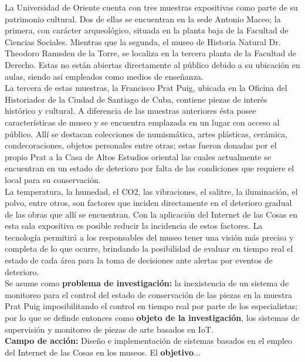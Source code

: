     La Universidad de Oriente cuenta con tres muestras expositivas como parte de su patrimonio cultural. Dos de ellas se encuentran en la sede Antonio Maceo; la primera, con carácter arqueológico, situada en la planta baja de la Facultad de Ciencias Sociales. Mientras que la segunda, el museo de Historia Natural Dr. Theodoro Ramsden de la Torre, se localiza en la tercera planta de la Facultad de Derecho. Estas no están abiertas directamente al público debido a su ubicación en aulas, siendo así empleados como medios de enseñanza.\\ 
    
    La tercera de estas muestras, la Francisco Prat Puig, ubicada en la Oficina del Historiador de la Ciudad de Santiago de Cuba, contiene piezas de interés histórico y cultural. A diferencia de las muestras anteriores ésta posee características de museo y se encuentra emplazada en un lugar con acceso al público. Allí se destacan colecciones de numismática, artes plásticas, cerámica, condecoraciones, objetos personales entre otras; estas fueron donadas por el propio Prat a la Casa de Altos Estudios oriental las cuales actualmente se encuentran en un estado de deterioro por falta de las condiciones que requiere el local para su conservación.\\
    
    La temperatura, la humedad, el CO2, las vibraciones, el salitre, la iluminación, el polvo, entre otros, son factores que inciden directamente en el deterioro gradual de las obras que allí se encuentran. Con la aplicación del Internet de las Cosas en esta sala expositiva es posible reducir la incidencia de estos factores. La tecnología permitirá a los responsables del museo tener una visión más precisa y completa de lo que ocurre, brindando la posibilidad de evaluar en tiempo real el estado de cada área para la toma de decisiones ante alertas por eventos de deterioro.\\

    Se asume como \textbf{problema de investigación:} la inexistencia de un sistema de monitoreo para el control del estado de conservación de las piezas en la muestra Prat Puig imposibilitando el control en tiempo real por parte de los especialistas; por lo que se definde entonces como \textbf{objeto de la investigación}, los sistemas de supervisión y monitoreo de piezas de arte basados en IoT.\\
    
    \textbf{Campo de acción:} Diseño e implementación de sistemas basados en el empleo del Internet de las Cosas en los museos. El \textbf{objetivo}...

